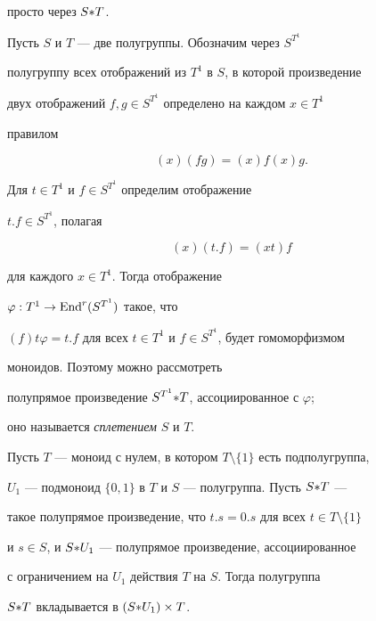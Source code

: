 просто через $S{*} T$.





\begin{exams}


Пусть $S$ и $T$ --- две полугруппы. Обозначим через $S^{T^1}$


полугруппу всех отображений из $T^1$ в $S$, в которой произведение


двух отображений $f,g\in S^{T^1}$ определено на каждом $x\in T^1$


правилом


$$


(x)(fg)=(x)f(x)g.


$$


Для $t\in T^1$ и $f\in S^{T^1}$ определим отображение


$t.f\in S^{T^1}$, полагая


$$


(x)(t.f)=(xt)f


$$


для каждого $x\in T^1$. Тогда отображение


$\varphi:T^1\rightarrow\operatorname{End}^r(S^{T^1})$ такое, что


$(f)t\varphi=t.f$ для всех $t\in T^1$ и $f\in S^{T^1}$, будет гомоморфизмом


моноидов. Поэтому можно рассмотреть


полупрямое произведение $S^{T^1}{*} T$, ассоциированное с $\varphi$;


оно называется {\it сплетением} $S$ и $T$.


\end{exams}





\begin{lems} \label{odiv2}


Пусть $T$ --- моноид с нулем, в котором $T\setminus\{1\}$ есть подполугруппа,


$U_1$ --- подмоноид $\{0,1\}$ в $T$ и $S$ --- полугруппа. Пусть $S{*} T$ ---


такое полупрямое произведение, что $t.s=0.s$ для всех $t\in T\setminus\{1\}$


и $s\in S$, и $S{*} U_1$ --- полупрямое произведение, ассоциированное


с ограничением на $U_1$ действия $T$ на $S$. Тогда полугруппа


$S{*} T$ вкладывается в $(S{*} U_1)\times T$.


\end{lems}





